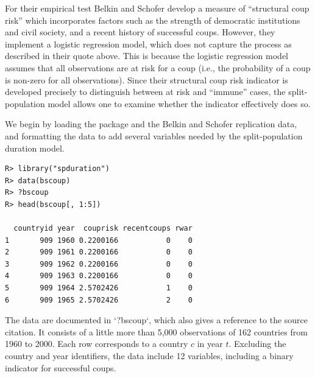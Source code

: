 \documentclass[12pt,onesided]{amsart}
\begin{document}
For their empirical test Belkin and Schofer develop a measure of
``structural coup risk'' which incorporates factors such as the strength
of democratic institutions and civil society, and a recent history of
successful coups. However, they implement a logistic regression model,
which does not capture the process as described in their quote above.
This is because the logistic regression model assumes that all
observations are at risk for a coup (i.e., the probability of a coup is
non-zero for all observations). Since their structural coup risk
indicator is developed precisely to distinguish between at risk and
``immune'' cases, the split-population model allows one to examine
whether the indicator effectively does so.

We begin by loading the package and the Belkin and Schofer replication
data, and formatting the data to add several variables needed by the
split-population duration model.

\begin{lstlisting}
R> library("spduration")
R> data(bscoup)
R> ?bscoup
R> head(bscoup[, 1:5])

  countryid year  couprisk recentcoups rwar
1       909 1960 0.2200166           0    0
2       909 1961 0.2200166           0    0
3       909 1962 0.2200166           0    0
4       909 1963 0.2200166           0    0
5       909 1964 2.5702426           1    0
6       909 1965 2.5702426           2    0

\end{lstlisting}

The data are documented in `?bscoup`, which also gives a reference to the source citation. It consists of a little more than 5,000 observations of 162 countries from 1960 to 2000. Each row corresponds to a country $c$ in year $t$. Excluding the country and year identifiers, the data include 12 variables, including a binary indicator for successful coups. 
\end{document}
